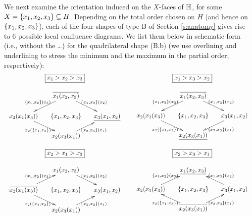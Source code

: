 We next examine the orientation induced on the $X$-faces of $\hyper{H}$, for some $X=\set{x_1,x_2,x_3}\inc H$. 
Depending on the total order chosen on $H$ (and hence on $\set{x_1,x_2,x_3}$), each of the four shapes of type B of Section \ref{s:anatomy} gives rise to 6 possible local confluence diagrams. 
We list them below in schematic form (i.e., without the \ldots) for the quadrilateral shape (B.b) (we use overlining and underlining to stress the minimum and the maximum in the partial order, respectively):
$$\begin{array}{ccc}
\boxed{x_1>x_2>x_3} && \boxed{x_1>x_3>x_2}\\
&&\\
\xymatrix @-1.65pc {&& \overline{x_1(x_2,x_3)} \ar @{->}[ddll]_{\set{x_1,x_2}(x_3)} \ar @{->}[ddrr]^{\set{x_1,x_3}(x_2)}&& \\
&&&&\\
x_2(x_1(x_3)) \ar @{->}[ddrr]_{x_2(\set{x_1,x_3})}&& \set{x_1,x_2,x_3}  && \underline{x_3(x_1,x_2)}\ar @{<-}[ddll]^{\set{x_2,x_3}(x_1)}\\
&&&&\\
&&  x_2(x_3(x_1))&&}
&&


\xymatrix @-1.65pc {&& \overline{x_1(x_2,x_3)} \ar @{->}[ddll]_{\set{x_1,x_2}(x_3)} \ar @{->}[ddrr]^{\set{x_1,x_3}(x_2)}&& \\
&&&&\\
x_2(x_1(x_3)) \ar @{->}[ddrr]_{x_2(\set{x_1,x_3})}&& \set{x_1,x_2,x_3}  && x_3(x_1,x_2)\ar @{->}[ddll]^{\set{x_2,x_3}(x_1)}\\
&&&&\\
&&  \underline{x_2(x_3(x_1))}&&}
\end{array}
$$

\medskip
$$\begin{array}{ccc}
\boxed{x_2>x_1>x_3} && \boxed{x_2>x_3>x_1}\\
&&\\
\xymatrix @-1.65pc {&&x_1(x_2,x_3) \ar @{<-}[ddll]_{\set{x_1,x_2}(x_3)} \ar @{->}[ddrr]^{\set{x_1,x_3}(x_2)}&& \\
&&&&\\
\overline{x_2(x_1(x_3))} \ar @{->}[ddrr]_{x_2(\set{x_1,x_3})}&& \set{x_1,x_2,x_3}  && \underline{x_3(x_1,x_2)}\ar @{<-}[ddll]^{\set{x_2,x_3}(x_1)}\\
&&&&\\
&& x_2(x_3(x_1))&&}
&&


\xymatrix @-1.65pc{&&  \underline{x_1(x_2,x_3)} \ar @{<-}[ddll]_{\set{x_1,x_2}(x_3)} \ar @{<-}[ddrr]^{\set{x_1,x_3}(x_2)}&& \\
&&&&\\
x_2(x_1(x_3)) \ar @{<-}[ddrr]_{x_2(\set{x_1,x_3})}&& \set{x_1,x_2,x_3}  && x_3(x_1,x_2)\ar @{<-}[ddll]^{\set{x_2,x_3}(x_1)}\\
&&&&\\
&&   \overline{x_2(x_3(x_1))}&&}
 \end{array}
$$

